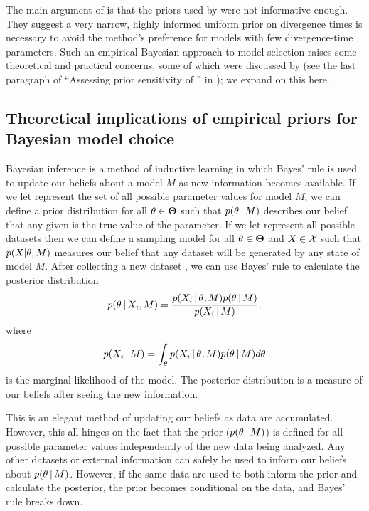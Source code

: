 \documentclass[letterpaper,12pt]{article}
\begin{document}
\begin{linenumbers}
The main argument of \citet{Hickerson2013} is that the priors used by
\citet{Oaks2012} were not informative enough.
They suggest a very narrow, highly informed uniform prior on divergence times
is necessary to avoid the method's preference for models with few
divergence-time parameters.
Such an empirical Bayesian approach to model selection raises some theoretical
and practical concerns, some of which were discussed by \citet{Oaks2012} (see
the last paragraph of ``Assessing prior sensitivity of \msb'' in
\citet{Oaks2012}); we expand on this here.

\subsection*{Theoretical implications of empirical priors for Bayesian model
choice}
\begin{linenomath}
Bayesian inference is a method of inductive learning in which Bayes' rule is
used to update our beliefs about a model $M$ as new information becomes
available.
If we let \allParameterValues represent the set of all possible parameter
values for model $M$, we can define a prior distribution for all $\theta \in
\boldsymbol{\Theta}$ such that $p(\theta \,|\, M)$ describes our belief that
any given \myTheta{} is the true value of the parameter.
If we let \allDatasets represent all possible datasets then we can 
define a sampling model for all $\theta \in
\boldsymbol{\Theta}$ and $\alignment{}{} \in \allDatasets$ such that
$p(\alignment{}{} | \theta, M)$ measures our belief that any dataset \alignment{}{}
will be generated by any state \myTheta{} of model $M$.
After collecting a new dataset , we can use Bayes' rule to
calculate the posterior distribution
\begin{equation}
    p(\myTheta{} \given \alignment{i}{}, M) = \frac{p(\alignment{i}{} \given
    \myTheta{}, M)p(\myTheta{} \given M)}{p(\alignment{i}{} \given M)},
    \label{eq:bayesrule}
\end{equation}
where
\begin{equation}
    p(\alignment{i}{} \given M) = \int_{\myTheta{}} p(\alignment{i}{} \given
    \myTheta{}, M)p(\myTheta{} \given M) d\myTheta{}
    \label{eq:marginallikelhiood}
\end{equation}
is the marginal likelihood of the model.
The posterior distribution is a measure of our beliefs after seeing the new
information.
\end{linenomath}

This is an elegant method of updating our beliefs as data are accumulated.
However, this all hinges on the fact that the prior ($p(\theta_{} \,|\, M)$)
is defined for all possible parameter values independently of the new data
being analyzed.
Any other datasets or external information can safely be used to inform our
beliefs about $p(\theta_{} \,|\, M)$.
However, if the same data are used to both inform the prior and calculate the
posterior, the prior becomes conditional on the data, and Bayes' rule breaks
down.


\end{linenumbers}
\end{document}
